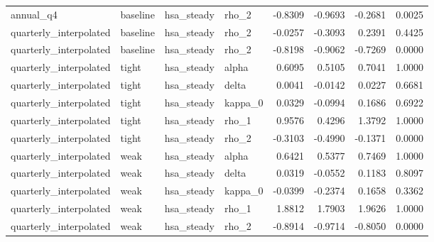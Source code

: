 \begin{tabular}{llllrrrr}
annual\_q4 & baseline & hsa\_steady & rho\_2 & -0.8309 & -0.9693 & -0.2681 & 0.0025 \\
quarterly\_interpolated & baseline & hsa\_steady & rho\_2 & -0.0257 & -0.3093 & 0.2391 & 0.4425 \\
quarterly\_interpolated & baseline & hsa\_steady & rho\_2 & -0.8198 & -0.9062 & -0.7269 & 0.0000 \\
quarterly\_interpolated & tight & hsa\_steady & alpha & 0.6095 & 0.5105 & 0.7041 & 1.0000 \\
quarterly\_interpolated & tight & hsa\_steady & delta & 0.0041 & -0.0142 & 0.0227 & 0.6681 \\
quarterly\_interpolated & tight & hsa\_steady & kappa\_0 & 0.0329 & -0.0994 & 0.1686 & 0.6922 \\
quarterly\_interpolated & tight & hsa\_steady & rho\_1 & 0.9576 & 0.4296 & 1.3792 & 1.0000 \\
quarterly\_interpolated & tight & hsa\_steady & rho\_2 & -0.3103 & -0.4990 & -0.1371 & 0.0000 \\
quarterly\_interpolated & weak & hsa\_steady & alpha & 0.6421 & 0.5377 & 0.7469 & 1.0000 \\
quarterly\_interpolated & weak & hsa\_steady & delta & 0.0319 & -0.0552 & 0.1183 & 0.8097 \\
quarterly\_interpolated & weak & hsa\_steady & kappa\_0 & -0.0399 & -0.2374 & 0.1658 & 0.3362 \\
quarterly\_interpolated & weak & hsa\_steady & rho\_1 & 1.8812 & 1.7903 & 1.9626 & 1.0000 \\
quarterly\_interpolated & weak & hsa\_steady & rho\_2 & -0.8914 & -0.9714 & -0.8050 & 0.0000 \\
\bottomrule
\end{tabular}
